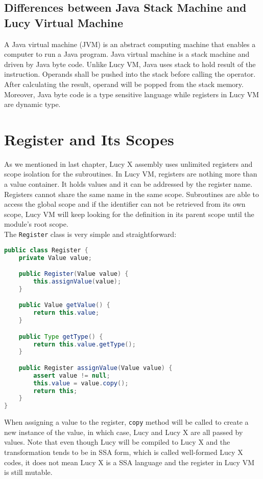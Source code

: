 \subsection{Differences between Java Stack Machine and Lucy Virtual Machine}
A Java virtual machine (JVM) is an abstract computing machine that enables a computer to run a Java program. Java virtual machine is a stack machine and driven by Java byte code. Unlike Lucy VM, Java uses stack to hold result of the instruction. Operands shall be pushed into the stack before calling the operator. After calculating the result, operand will be popped from the stack memory. Moreover, Java byte code is a type sensitive language while registers in Lucy VM are dynamic type.


\section{Register and Its Scopes}
As we mentioned in last chapter, Lucy X assembly uses unlimited registers and scope isolation for the subroutines. In Lucy VM, registers are nothing more than a value container. It holds values and it can be addressed by the register name. Registers cannot share the same name in the same scope. Subroutines are able to access the global scope and if the identifier can not be retrieved from its own scope, Lucy VM will keep looking for the definition in its parent scope until the module’s root scope. \\
The \texttt{Register} class is very simple and straightforward:
\begin{lstlisting}[language=java]
public class Register {
    private Value value;

    public Register(Value value) {
        this.assignValue(value);
    }

    public Value getValue() {
        return this.value;
    }

    public Type getType() {
        return this.value.getType();
    }

    public Register assignValue(Value value) {
        assert value != null;
        this.value = value.copy();
        return this;
    }
}
\end{lstlisting}
When assigning a value to the register, \texttt{copy} method will be called to create a new instance of the value, in which case, Lucy and Lucy X are all passed by values. Note that even though Lucy will be compiled to Lucy X and the transformation tends to be in SSA form, which is called well-formed Lucy X codes, it does not mean Lucy X is a SSA language and the register in Lucy VM is still mutable. \\
